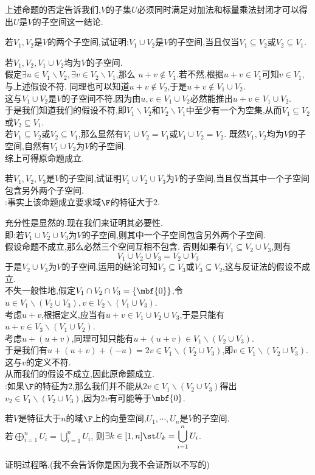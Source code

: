 \documentclass{ctexart}
\begin{document}
上述命题的否定告诉我们,$V$的子集$U$必须同时满足对加法和标量乘法封闭才可以得出$U$是$V$的子空间这一结论.
\begin{problem}[Example 2.1]
    若$V_1,V_2$是$V$的两个子空间,试证明:$V_1\cup V_2$是$V$的子空间,当且仅当$V_1\subseteq V_2$或$V_2\subseteq V_1$.
\end{problem}
\begin{solution}[Proof.]
    若$V_1,V_2,V_1\cup V_2$均为$V$的子空间.\\
    假定$\exists u\in V_1\backslash V_2,\exists v\in V_2\backslash V_1$,那么
    $u+v\notin V_1$.若不然,根据$u+v\in V_1$可知$v\in V_1$,与上述假设不符.
    同理也可以知道$u+v\notin V_2$,于是$u+v\notin V_1\cup V_2$.\\
    这与$V_1\cup V_2$是$V$的子空间不符,因为由$u,v\in V_1\cup V_2$必然能推出$u+v\in V_1\cup V_2$.\\
    于是我们知道我们的假设不符,即$V_1\backslash V_2$和$V_2\backslash V_1$中至少有一个为空集,从而$V_1\subseteq V_2$或$V_2\subseteq V_1$.\\
    若$V_1\subseteq V_2$或$V_2\subseteq V_1$,那么显然有$V_1\cup V_2=V_1$或$V_1\cup V_2=V_2$.
    既然$V_1,V_2$均为$V$的子空间,自然有$V_1\cup V_2$为$V$的子空间.\\
    综上可得原命题成立.
\end{solution}
\begin{problem}[Example 2.2]
    若$V_1,V_2,V_3$是$V$的子空间,试证明$V_1\cup V_2\cup V_3$为$V$的子空间,当且仅当其中一个子空间包含另外两个子空间.\\
    :事实上该命题成立要求域$\F$的特征大于$2$.
\end{problem}
\begin{solution}[Proof.]
    充分性是显然的.现在我们来证明其必要性.\\
    即:若$V_1\cup V_2\cup V_3$为$V$的子空间,则其中一个子空间包含另外两个子空间.\\
    假设命题不成立,那么必然三个空间互相不包含.
    否则如果有$V_1\subseteq V_2\cup V_3$,则有
    $$V_1\cup V_2\cup V_3=V_2\cup V_3$$
    于是$V_2\cup V_3$为$V$的子空间.运用的结论可知$V_2\subseteq V_3$或$V_3\subseteq V_2$,这与反证法的假设不成立.\\
    不失一般性地,假定$V_1\cap V_2\cap V_3=\left\{\mbf{0}\right\}$,令$u\in V_1\backslash(V_2\cup V_3),v\in V_2\backslash(V_1\cup V_3)$.\\
    考虑$u+v$,根据定义,应当有$u+v\in V_1\cup V_2 \cup V_3$,于是只能有$u+v\in V_3\backslash(V_1\cup V_2)$.\\
    考虑$u+(u+v)$,同理可知只能有$u+(u+v)\in V_1\backslash(V_2\cup V_3)$.\\
    于是我们有$u+(u+v)+(-u)=2v\in V_1\backslash(V_2\cup V_3)$,即$v\in V_1\backslash(V_2\cup V_3)$.这与$v$的定义不符.\\
    从而我们的假设不成立,因此原命题成立.\\
    :如果$\F$的特征为$2$,那么我们并不能从$2v\in V_1\backslash(V_2\cup V_3)$得出$v_2\in V_1\backslash(V_2\cup V_3)$,因为$2v$有可能等于$\mbf{0}$.
\end{solution}
\begin{problem}[Example 2.3]
    若$V$是特征大于$n$的域$\F$上的向量空间,$U_1,\cdots,U_n$是$V$的子空间.\\
    若$\displaystyle\bigoplus_{i=1}^{n}U_i=\bigcup_{i=1}^{n}U_i$,
    则$\displaystyle\exists k\in[1,n]\st U_k=\bigcup_{i=1}^{n}U_i$.
\end{problem}
\begin{solution}
    证明过程略.(我不会告诉你是因为我不会证所以不写的)
\end{solution}
\end{document}
